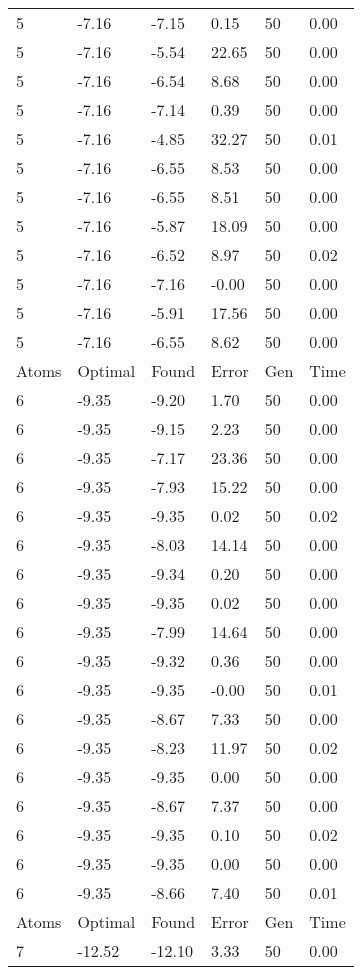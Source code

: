 \documentclass{report}
\begin{document}
\begin{appendix}
\begin{longtable}{llllll}
5 & -7.16 & -7.15 & 0.15 & 50 & 0.00 \\
5 & -7.16 & -5.54 & 22.65 & 50 & 0.00 \\
5 & -7.16 & -6.54 & 8.68 & 50 & 0.00 \\
5 & -7.16 & -7.14 & 0.39 & 50 & 0.00 \\
5 & -7.16 & -4.85 & 32.27 & 50 & 0.01 \\
5 & -7.16 & -6.55 & 8.53 & 50 & 0.00 \\
5 & -7.16 & -6.55 & 8.51 & 50 & 0.00 \\
5 & -7.16 & -5.87 & 18.09 & 50 & 0.00 \\
5 & -7.16 & -6.52 & 8.97 & 50 & 0.02 \\
5 & -7.16 & -7.16 & -0.00 & 50 & 0.00 \\
5 & -7.16 & -5.91 & 17.56 & 50 & 0.00 \\
5 & -7.16 & -6.55 & 8.62 & 50 & 0.00 \\
Atoms & Optimal & Found & Error & Gen & Time \\
6 & -9.35 & -9.20 & 1.70 & 50 & 0.00 \\
6 & -9.35 & -9.15 & 2.23 & 50 & 0.00 \\
6 & -9.35 & -7.17 & 23.36 & 50 & 0.00 \\
6 & -9.35 & -7.93 & 15.22 & 50 & 0.00 \\
6 & -9.35 & -9.35 & 0.02 & 50 & 0.02 \\
6 & -9.35 & -8.03 & 14.14 & 50 & 0.00 \\
6 & -9.35 & -9.34 & 0.20 & 50 & 0.00 \\
6 & -9.35 & -9.35 & 0.02 & 50 & 0.00 \\
6 & -9.35 & -7.99 & 14.64 & 50 & 0.00 \\
6 & -9.35 & -9.32 & 0.36 & 50 & 0.00 \\
6 & -9.35 & -9.35 & -0.00 & 50 & 0.01 \\
6 & -9.35 & -8.67 & 7.33 & 50 & 0.00 \\
6 & -9.35 & -8.23 & 11.97 & 50 & 0.02 \\
6 & -9.35 & -9.35 & 0.00 & 50 & 0.00 \\
6 & -9.35 & -8.67 & 7.37 & 50 & 0.00 \\
6 & -9.35 & -9.35 & 0.10 & 50 & 0.02 \\
6 & -9.35 & -9.35 & 0.00 & 50 & 0.00 \\
6 & -9.35 & -8.66 & 7.40 & 50 & 0.01 \\
Atoms & Optimal & Found & Error & Gen & Time \\
7 & -12.52 & -12.10 & 3.33 & 50 & 0.00 \\

\end{longtable}
\end{appendix}
\end{document}
